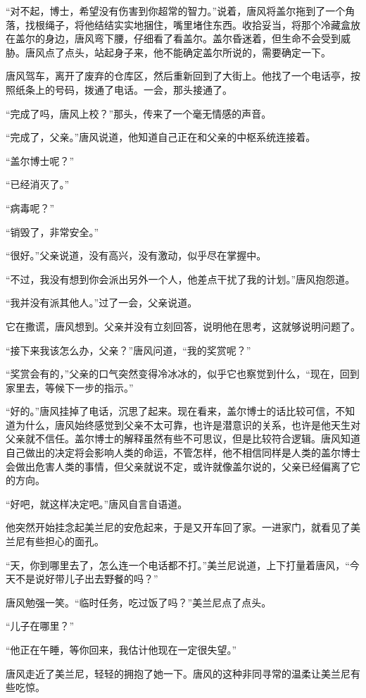 “对不起，博士，希望没有伤害到你超常的智力。”说着，唐风将盖尔拖到了一个角落，找根绳子，将他结结实实地捆住，嘴里堵住东西。收拾妥当，将那个冷藏盒放在盖尔的身边，唐风弯下腰，仔细看了看盖尔。盖尔昏迷着，但生命不会受到威胁。唐风点了点头，站起身子来，他不能确定盖尔所说的，需要确定一下。

唐风驾车，离开了废弃的仓库区，然后重新回到了大街上。他找了一个电话亭，按照纸条上的号码，拨通了电话。一会，那头接通了。

“完成了吗，唐风上校？”那头，传来了一个毫无情感的声音。

“完成了，父亲。”唐风说道，他知道自己正在和父亲的中枢系统连接着。

“盖尔博士呢？”

“已经消灭了。”

“病毒呢？”

“销毁了，非常安全。”

“很好。”父亲说道，没有高兴，没有激动，似乎尽在掌握中。

“不过，我没有想到你会派出另外一个人，他差点干扰了我的计划。”唐风抱怨道。

“我并没有派其他人。”过了一会，父亲说道。

它在撒谎，唐风想到。父亲并没有立刻回答，说明他在思考，这就够说明问题了。

“接下来我该怎么办，父亲？”唐风问道，“我的奖赏呢？”

“奖赏会有的，”父亲的口气突然变得冷冰冰的，似乎它也察觉到什么，“现在，回到家里去，等候下一步的指示。”

“好的。”唐风挂掉了电话，沉思了起来。现在看来，盖尔博士的话比较可信，不知道为什么，唐风始终感觉到父亲不太可靠，也许是潜意识的关系，也许是他天生对父亲就不信任。盖尔博士的解释虽然有些不可思议，但是比较符合逻辑。唐风知道自己做出的决定将会影响人类的命运，不管怎样，他不相信同样是人类的盖尔博士会做出危害人类的事情，但父亲就说不定，或许就像盖尔说的，父亲已经偏离了它的方向。

“好吧，就这样决定吧。”唐风自言自语道。

他突然开始挂念起美兰尼的安危起来，于是又开车回了家。一进家门，就看见了美兰尼有些担心的面孔。

“天，你到哪里去了，怎么连一个电话都不打。”美兰尼说道，上下打量着唐风，“今天不是说好带儿子出去野餐的吗？”

唐风勉强一笑。“临时任务，吃过饭了吗？”美兰尼点了点头。

“儿子在哪里？”

“他正在午睡，等你回来，我估计他现在一定很失望。”

唐风走近了美兰尼，轻轻的拥抱了她一下。唐风的这种非同寻常的温柔让美兰尼有些吃惊。

